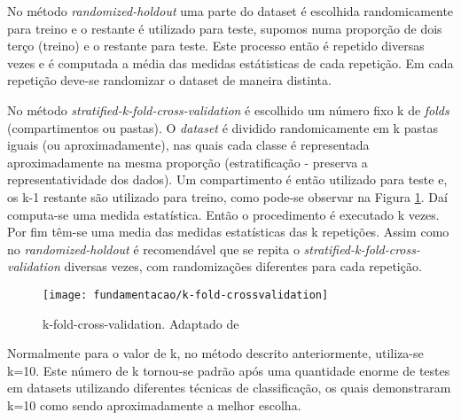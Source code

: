 No método \textit{randomized-holdout} uma parte do dataset é escolhida randomicamente para treino e o restante é utilizado para teste, supomos numa proporção de dois terço (treino) e o restante para teste. Este processo então é repetido diversas vezes e é computada a média das medidas estátisticas de cada repetição. Em cada repetição deve-se randomizar o dataset de maneira distinta.\cite{Witten:2005} 

No método \textit{stratified-k-fold-cross-validation} é escolhido um número fixo k de \textit{folds} (compartimentos ou pastas). O \textit{dataset} é dividido randomicamente em k pastas iguais (ou aproximadamente), nas quais cada classe é representada aproximadamente na mesma proporção (estratificação - preserva a representatividade dos dados). 
Um compartimento é então utilizado para teste e, os k-1 restante são utilizado para treino, como pode-se observar na Figura \ref{fig:kfoldcrossvalidation}. Daí computa-se uma medida estatística. Então o procedimento é executado k vezes. Por fim têm-se uma media das medidas estatísticas das k repetições. Assim como no \textit{randomized-holdout} é recomendável que se repita o \textit{stratified-k-fold-cross-validation} diversas vezes, com randomizações diferentes para cada repetição.\cite{Witten:2005}

\begin{figure}[!htb] \centering 
  \centering
  \texttt{[image: fundamentacao/k-fold-crossvalidation]} 
  \caption{k-fold-cross-validation. Adaptado de\cite{Olson:2008}} 
  \label{fig:kfoldcrossvalidation}
\end{figure}

Normalmente para o valor de k, no método descrito anteriormente, utiliza-se k=10. Este número de k tornou-se padrão após uma quantidade enorme de testes em datasets utilizando diferentes técnicas de classificação, os quais demonstraram k=10 como sendo aproximadamente a melhor escolha.\cite{Witten:2005}